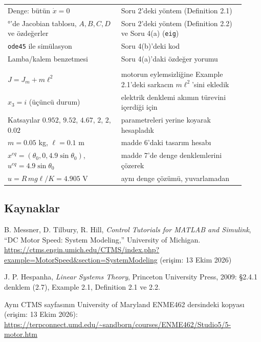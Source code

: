 \documentclass[11pt,a4paper]{article}
\begin{document}
\begin{center}
\begin{tabular}{>{\raggedright\arraybackslash}p{0.44\linewidth}>{\raggedright\arraybackslash}p{0.48\linewidth}}
Denge: bütün $\dot x = 0$ & Soru 2'deki yöntem (Definition 2.1)\\
90°'de Jacobian tablosu, $A, B, C, D$ ve özdeğerler & Soru 2'deki yöntem (Definition 2.2) ve Soru 4(a) (\texttt{eig})\\
\texttt{ode45} ile simülasyon & Soru 4(b)'deki kod\\
Lamba/kalem benzetmesi & Soru 4(a)'daki özdeğer yorumu\\
\midrule
\multicolumn{2}{l}{\textit{Bizim kurduklarımız}}\\
$J = J_m + m\ell^2$ & motorun eylemsizliğine Example 2.1'deki sarkacın $m\ell^2$'sini ekledik\\
$x_3 = i$ (üçüncü durum) & elektrik denklemi akımın türevini içerdiği için\\
Katsayılar $0.952$, $9.52$, $4.67$, $2$, $2$, $0.02$ & parametreleri yerine koyarak hesapladık\\
$m = 0.05$ kg, $\ell = 0.1$ m & madde 6'daki tasarım hesabı\\
$x^{eq} = (\theta_0, 0, 4.9\sin\theta_0)$, $u^{eq} = 4.9\sin\theta_0$ & madde 7'de denge denklemlerini çözerek\\
$u = R\,mg\ell/K = 4.905$ V & aynı denge çözümü, yuvarlamadan\\
\bottomrule
\end{tabular}
\end{center}

\subsection*{Kaynaklar}
\begin{enumerate}[label={[\arabic*]}, leftmargin=*]
  \item B. Messner, D. Tilbury, R. Hill, \emph{Control Tutorials for MATLAB and Simulink}, ``DC Motor Speed: System Modeling,'' University of Michigan. \url{https://ctms.engin.umich.edu/CTMS/index.php?example=MotorSpeed&section=SystemModeling} (erişim: 13 Ekim 2026)
  \item J. P. Hespanha, \emph{Linear Systems Theory}, Princeton University Press, 2009: §2.4.1 denklem (2.7), Example 2.1, Definition 2.1 ve 2.2.
  \item Aynı CTMS sayfasının University of Maryland ENME462 dersindeki kopyası (erişim: 13 Ekim 2026):\\ \url{https://terpconnect.umd.edu/~sandborn/courses/ENME462/Studio5/5-motor.htm}
\end{enumerate}
\end{document}

